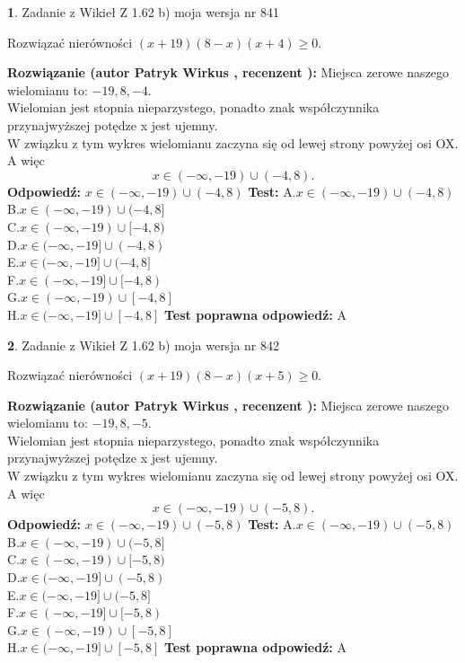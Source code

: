 \documentclass[12pt, a4paper]{article}
\theoremstyle{definition} %
\newtheorem{zad}{}
\newcommand{\zadStart}[1]{\begin{zad}#1\newline}
\newcommand{\zadStop}{\end{zad}}
\newcommand{\rozwStart}[2]{\noindent \textbf{Rozwiązanie (autor #1 , recenzent #2): }\newline}
\newcommand{\rozwStop}{\newline}
\newcommand{\odpStart}{\noindent \textbf{Odpowiedź:}\newline}
\newcommand{\odpStop}{\newline}
\newcommand{\testStart}{\noindent \textbf{Test:}\newline}
\newcommand{\testStop}{\newline}
\newcommand{\kluczStart}{\noindent \textbf{Test poprawna odpowiedź:}\newline}
\newcommand{\kluczStop}{\newline}
\begin{document}
\zadStart{Zadanie z Wikieł Z 1.62 b) moja wersja nr 841}

Rozwiązać nierówności $(x+19)(8-x)(x+4)\ge0$.
\zadStop
\rozwStart{Patryk Wirkus}{}
Miejsca zerowe naszego wielomianu to: $-19, 8, -4$.\\
Wielomian jest stopnia nieparzystego, ponadto znak współczynnika przy\linebreak najwyższej potędze x jest ujemny.\\ W związku z tym wykres wielomianu zaczyna się od lewej strony powyżej osi OX. A więc $$x \in (-\infty,-19) \cup (-4,8).$$
\rozwStop
\odpStart
$x \in (-\infty,-19) \cup (-4,8)$
\odpStop
\testStart
A.$x \in (-\infty,-19) \cup (-4,8)$\\
B.$x \in (-\infty,-19) \cup (-4,8]$\\
C.$x \in (-\infty,-19) \cup [-4,8)$\\
D.$x \in (-\infty,-19] \cup (-4,8)$\\
E.$x \in (-\infty,-19] \cup (-4,8]$\\
F.$x \in (-\infty,-19] \cup [-4,8)$\\
G.$x \in (-\infty,-19) \cup [-4,8]$\\
H.$x \in (-\infty,-19] \cup [-4,8]$
\testStop
\kluczStart
A
\kluczStop



\zadStart{Zadanie z Wikieł Z 1.62 b) moja wersja nr 842}

Rozwiązać nierówności $(x+19)(8-x)(x+5)\ge0$.
\zadStop
\rozwStart{Patryk Wirkus}{}
Miejsca zerowe naszego wielomianu to: $-19, 8, -5$.\\
Wielomian jest stopnia nieparzystego, ponadto znak współczynnika przy\linebreak najwyższej potędze x jest ujemny.\\ W związku z tym wykres wielomianu zaczyna się od lewej strony powyżej osi OX. A więc $$x \in (-\infty,-19) \cup (-5,8).$$
\rozwStop
\odpStart
$x \in (-\infty,-19) \cup (-5,8)$
\odpStop
\testStart
A.$x \in (-\infty,-19) \cup (-5,8)$\\
B.$x \in (-\infty,-19) \cup (-5,8]$\\
C.$x \in (-\infty,-19) \cup [-5,8)$\\
D.$x \in (-\infty,-19] \cup (-5,8)$\\
E.$x \in (-\infty,-19] \cup (-5,8]$\\
F.$x \in (-\infty,-19] \cup [-5,8)$\\
G.$x \in (-\infty,-19) \cup [-5,8]$\\
H.$x \in (-\infty,-19] \cup [-5,8]$
\testStop
\kluczStart
A
\kluczStop
\end{document}
